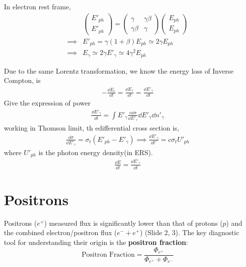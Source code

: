 \documentclass{sciposter}
\begin{document}
\begin{multicols}{3}
In electron rest frame,
\begin{align}
    &\begin{pmatrix}
    E'_{ph} \\
    E'_{ph} 
    \end{pmatrix}=\begin{pmatrix}
    \gamma &\gamma \beta \\
    \gamma \beta &\gamma 
    \end{pmatrix}\begin{pmatrix}
    E_{ph} \\
    E_{ph} 
    \end{pmatrix}\\
    \implies &E'_{ph}=\gamma(1+\beta)E_{ph}\simeq 2\gamma E_{ph}   \\
    \implies&E_{\gamma} \simeq 2 \gamma E'_{\gamma}\simeq 4 \gamma ^{2}E_{ph}    
\end{align}

Due to the same Lorentz transformation, we know the energy loss of Inverse Compton, is 
\begin{align}
    -\frac{\dd{E_{e} }}{\dd{t}}=\frac{\dd{E_{\gamma} }}{\dd{t}}=\frac{\dd{E'_{\gamma} }}{\dd{t}}
\end{align}
Give the expression of power 
\begin{align}
    \frac{\dd{E'_{\gamma} }}{\dd{t}}=\int E'_{\gamma}\frac{c\dd{\sigma}}{\dd{E'_{\gamma} }}\dd{E'_{\gamma} }\dd{n'_{\gamma} }
\end{align}
working in Thomson limit, th edifferential cross section is,
\begin{align}
    \frac{\dd{\sigma}}{\dd{E'_{\gamma} }}=\sigma_{t}(E'_{ph}-E'_{\gamma}  )\implies \frac{\dd{E'_{\gamma} }}{\dd{t'}}=c\sigma_{t}U'_{ph}   
\end{align}
where $U'_{ph} $ is the photon energy density(in ERS).
\begin{align}
    \frac{\dd{E}}{\dd{t}}=\frac{\dd{E'_{\gamma} }}{\dd{t}}
\end{align}

\section{ Positrons}
Positrons ($e^+$) measured flux is significantly lower than that of protons ($p$) and the combined electron/positron flux ($e^- + e^+$) (Slide 2, 3). The key diagnostic tool for understanding their origin is the \textbf{positron fraction}:
$$
\text{Positron Fraction} = \frac{\Phi_{e^+}}{\Phi_{e^+} + \Phi_{e^-}}
$$


\end{multicols}
\end{document}
